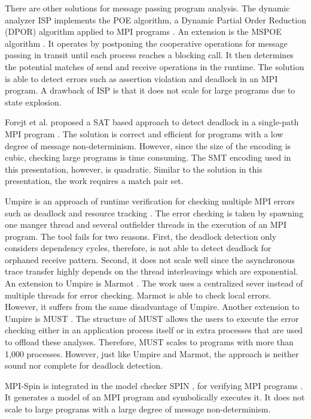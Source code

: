 There are other solutions for message passing program analysis.
The dynamic analyzer ISP implements the POE algorithm, a Dynamic Partial Order Reduction (DPOR) algorithm \cite{DBLP:conf/popl/FlanaganG05} applied to MPI programs \cite{DBLP:conf/ppopp/VakkalankaSGK08}. 
An extension is the MSPOE algorithm \cite{DBLP:conf/sbmf/SharmaGB12}. It operates by postponing the cooperative operations for message passing in transit until each process reaches a blocking call. It then determines the potential matches of send and receive operations in the runtime. The solution is able to detect errors such as assertion violation and deadlock in an MPI program.
A drawback of ISP is that it does not scale for large programs due to state explosion.

Forejt et al. proposed a SAT based approach to detect deadlock in a single-path MPI program \cite{DBLP:conf/fm/ForejtKNS14}. The solution is correct and efficient for programs with a low degree of message non-determinism. However, since the size of the encoding is cubic, checking large programs is time consuming. The SMT encoding used in this presentation, however, is quadratic. Similar to the solution in this presentation, the work requires a match pair set.

Umpire is an approach of runtime verification for checking multiple MPI errors such as deadlock and resource tracking \cite{DBLP:conf/sc/VetterS00}. The error checking is taken by spawning one manger thread and several outfielder threads in the execution of an MPI program. The tool fails for two reasons. First, the deadlock detection only considers dependency cycles, therefore, is not able to detect deadlock for orphaned receive pattern. Second, it does not scale well since the asynchronous trace transfer highly depends on the thread interleavings which are exponential. An extension to Umpire is Marmot \cite{DBLP:conf/parco/KrammerBMR03}. The work uses a centralized sever instead of multiple threads for error checking. Marmot is able to check local errors. However, it suffers from the same disadvantage of Umpire. Another extension to Umpire is MUST \cite{DBLP:conf/ptw/HilbrichSSM09}. The structure of MUST allows the users to execute the error checking either in an application process itself or in extra processes that are used to offload these analyses. Therefore, MUST scales to programs with more than 1,000 processes. However, just like Umpire and Marmot, the approach is neither sound nor complete for deadlock detection. 


MPI-Spin is integrated in the model checker SPIN \cite{DBLP:journals/tse/Holzmann97}, for verifying MPI programs \cite{DBLP:conf/vmcai/Siegel07,DBLP:conf/pvm/Siegel07}. It generates a model of an MPI program and symbolically executes it. It does not scale to large programs with a large degree of message non-determinism.

